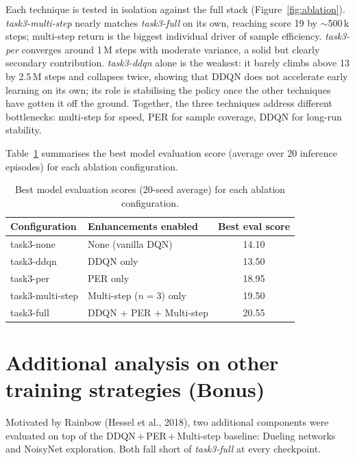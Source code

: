 \documentclass[12pt,a4paper]{report}
\begin{document}
Each technique is tested in isolation against the full stack (Figure~\ref{fig:ablation}).
\textit{task3-multi-step} nearly matches \textit{task3-full} on its own, reaching score 19
by $\sim$500\,k steps; multi-step return is the biggest individual driver of sample efficiency.
\textit{task3-per} converges around 1\,M steps with moderate variance, a solid but clearly
secondary contribution.
\textit{task3-ddqn} alone is the weakest: it barely climbs above 13 by 2.5\,M steps and
collapses twice, showing that DDQN does not accelerate early learning on its own;
its role is stabilising the policy once the other techniques have gotten it off the ground.
Together, the three techniques address different bottlenecks: multi-step for speed,
PER for sample coverage, DDQN for long-run stability.

Table~\ref{tab:ablation-best} summarises the best model evaluation score (average over
20 inference episodes) for each ablation configuration.

\begin{table}[H]
\centering
\caption{Best model evaluation scores (20-seed average) for each ablation configuration.}
\label{tab:ablation-best}
{\setlength{\tabcolsep}{18pt}
\begin{tabular}{llc}
\toprule
\textbf{Configuration} & \textbf{Enhancements enabled} & \textbf{Best eval score} \\
\midrule
task3-none       & None (vanilla DQN)         & 14.10   \\
task3-ddqn       & DDQN only                           & 13.50   \\
task3-per        & PER only                            & 18.95   \\
task3-multi-step & Multi-step ($n{=}3$) only           & 19.50   \\
task3-full       & DDQN + PER + Multi-step             & 20.55 \\
\bottomrule
\end{tabular}}
\end{table}

\newpage

\section{Additional analysis on other training strategies (Bonus)}

Motivated by Rainbow (Hessel et al., 2018), two additional components were evaluated on top
of the DDQN\,+\,PER\,+\,Multi-step baseline: Dueling networks and NoisyNet exploration.
Both fall short of \textit{task3-full} at every checkpoint.
\end{document}
